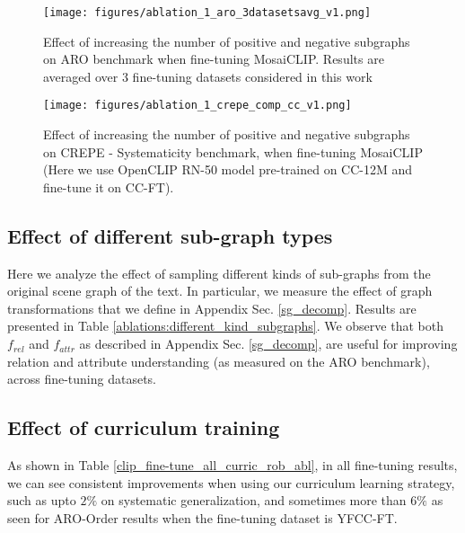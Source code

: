 \documentclass[11pt]{article}
\newcommand{\methodcomp}{MosaiCLIP}
\begin{document}
\begin{figure}[h!]
    \centering
    \texttt{[image: figures/ablation\_1\_aro\_3datasetsavg\_v1.png]}
    \caption{Effect of increasing the number of positive and negative subgraphs on {\color{blue} ARO} benchmark when fine-tuning \methodcomp{}. Results are averaged over 3 fine-tuning datasets considered in this work}
    \label{fig:abalation_num_posneg_aro}
\end{figure}

\begin{figure}[h!]
    \centering
    \texttt{[image: figures/ablation\_1\_crepe\_comp\_cc\_v1.png]}
    \caption{Effect of increasing the number of positive and negative subgraphs on {\color{blue} CREPE - Systematicity} benchmark, when fine-tuning \methodcomp{} (Here we use OpenCLIP RN-50 model pre-trained on CC-12M and fine-tune it on CC-FT).}
    \label{fig:abalation_num_posneg_crepe}
\end{figure}
\subsection{Effect of different sub-graph types}
Here we analyze the effect of sampling different kinds of sub-graphs from the original scene graph of the text. In particular, we measure the effect of graph transformations that we define in Appendix Sec. \ref{sg_decomp}. Results are presented in Table \ref{ablations:different_kind_subgraphs}. We observe that both $f_{rel}$ and $f_{attr}$ as described in Appendix Sec. \ref{sg_decomp}, are useful for improving relation and attribute understanding (as measured on the ARO benchmark), across fine-tuning datasets.\\

\subsection{Effect of curriculum training}
\label{curric_ft_effect}
As shown in Table \ref{clip_fine-tune_all_curric_rob_abl}, in all fine-tuning results, we can see consistent improvements when using our curriculum learning strategy, such as upto $2\%$ on systematic generalization, and sometimes more than $6\%$ as seen for ARO-Order results when the fine-tuning dataset is YFCC-FT. 
\end{document}
